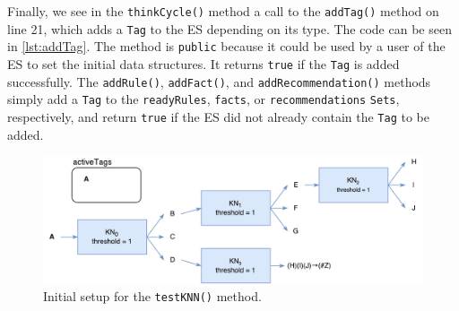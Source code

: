 \documentclass[titlepage,11pt]{article}
\def \espath {"/Users/seanstappas1/GitHub/prometheus-ai/src/main/java/es/api/ExpertSystem.java"}
\newcommand{\code}[1]{\texttt{#1}}
\begin{document}


Finally, we see in the \code{thinkCycle()} method a call to the \code{addTag()} method on line 21, which adds a \code{Tag} to the ES depending on its type. The code can be seen in \autoref{lst:addTag}. The method is \code{public} because it could be used by a user of the ES to set the initial data structures. It returns \code{true} if the \code{Tag} is added successfully. The \code{addRule()}, \code{addFact()}, and \code{addRecommendation()} methods simply add a \code{Tag} to the \code{readyRules}, \code{facts}, or \code{recommendations} \code{Sets}, respectively, and return \code{true} if the ES did not already contain the \code{Tag} to be added.

\begin{figure}[!htb]
\includegraphics[width=\textwidth]{figures/testKNN.pdf}
\caption[Setup for the \code{testKNN()} method.]
{Initial setup for the \code{testKNN()} method.}
\label{testKNN}
\end{figure}
\end{document}
